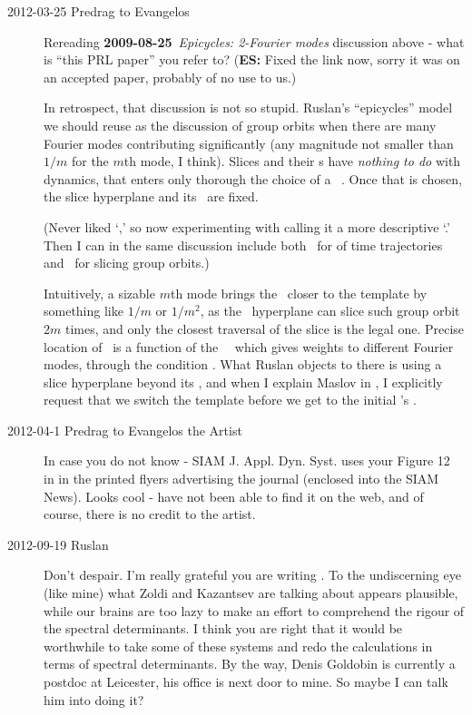 \begin{description}
\item[2012-03-25 Predrag to Evangelos]
Rereading  {\bf 2009-08-25}~{\em Epicycles:
2-Fourier modes} discussion above - what is ``{this PRL paper}'' you
refer to? ({\bf ES:} Fixed the link now, sorry it was on an accepted paper,
probably of no use to us.)

In retrospect, that discussion is not so stupid. Ruslan's ``epicycles''
model we should reuse as the discussion of group orbits when there are
many Fourier modes contributing significantly (any magnitude not smaller
than $1/m$ for the $m$th mode, I think). Slices and their \chartBord s
have \emph{nothing to do} with dynamics, that enters only thorough the
choice of a \template\ \slicep. Once that is chosen, the slice hyperplane
and its \chartBord\ are fixed.

(Never liked `\sset,' so now experimenting with calling it a more
descriptive `\chartBord.' Then I can in the same discussion include both
\poincBord\ for {\PoincSec} of time trajectories and \chartBord\ for
slicing group orbits.)

Intuitively, a sizable $m$th mode brings the \chartBord\ closer to the
template by something like $1/m$ or $1/m^2$, as the \slice\ hyperplane
can slice such group orbit $2m$ times, and only the closest traversal of
the slice is the legal one. Precise location of \chartBord\ is a function
of the \template\ \slicep\ which gives weights to different Fourier
modes, through the condition .  What Ruslan objects to
there is using a slice hyperplane beyond its \chartBord, and when I
explain Maslov in , I explicitly request that we
switch the template before we get to the initial \template's \chartBord.

\item[2012-04-1 Predrag to Evangelos the Artist]
In case you do not know - SIAM J. Appl. Dyn. Syst. uses your Figure 12 in
 in the printed flyers advertising the journal (enclosed
into the SIAM News). Looks cool - have not been able to find it on the
web, and of course, there is no credit to the artist.

\item[2012-09-19 Ruslan]
Don't despair.  I'm really grateful you are writing
. To the undiscerning eye (like mine) what Zoldi
and Kazantsev are talking about appears plausible, while our brains are
too lazy to make an effort to comprehend the rigour of the spectral
determinants.  I think you are right that it would be worthwhile to take
some of these systems and redo the calculations in terms of spectral
determinants.  By the way,
{Denis Goldobin} is currently a postdoc at
Leicester, his office is next door to mine.  So maybe I can talk him into
doing it?


\end{description}
